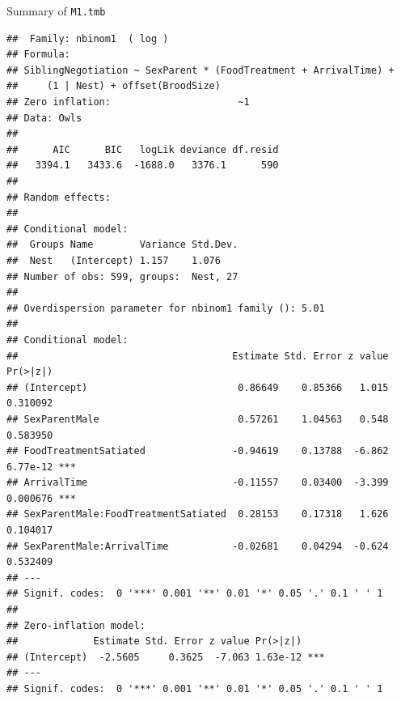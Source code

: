 \documentclass[
  ignorenonframetext,
]{beamer}
\begin{document}
\begin{frame}[fragile]{Summary of \texttt{M1.tmb}}
\protect\hypertarget{summary-of-m1.tmb}{}

\tiny

\begin{verbatim}
##  Family: nbinom1  ( log )
## Formula:          
## SiblingNegotiation ~ SexParent * (FoodTreatment + ArrivalTime) +  
##     (1 | Nest) + offset(BroodSize)
## Zero inflation:                      ~1
## Data: Owls
## 
##      AIC      BIC   logLik deviance df.resid 
##   3394.1   3433.6  -1688.0   3376.1      590 
## 
## Random effects:
## 
## Conditional model:
##  Groups Name        Variance Std.Dev.
##  Nest   (Intercept) 1.157    1.076   
## Number of obs: 599, groups:  Nest, 27
## 
## Overdispersion parameter for nbinom1 family (): 5.01 
## 
## Conditional model:
##                                     Estimate Std. Error z value Pr(>|z|)    
## (Intercept)                          0.86649    0.85366   1.015 0.310092    
## SexParentMale                        0.57261    1.04563   0.548 0.583950    
## FoodTreatmentSatiated               -0.94619    0.13788  -6.862 6.77e-12 ***
## ArrivalTime                         -0.11557    0.03400  -3.399 0.000676 ***
## SexParentMale:FoodTreatmentSatiated  0.28153    0.17318   1.626 0.104017    
## SexParentMale:ArrivalTime           -0.02681    0.04294  -0.624 0.532409    
## ---
## Signif. codes:  0 '***' 0.001 '**' 0.01 '*' 0.05 '.' 0.1 ' ' 1
## 
## Zero-inflation model:
##             Estimate Std. Error z value Pr(>|z|)    
## (Intercept)  -2.5605     0.3625  -7.063 1.63e-12 ***
## ---
## Signif. codes:  0 '***' 0.001 '**' 0.01 '*' 0.05 '.' 0.1 ' ' 1
\end{verbatim}

\end{frame}
\end{document}
